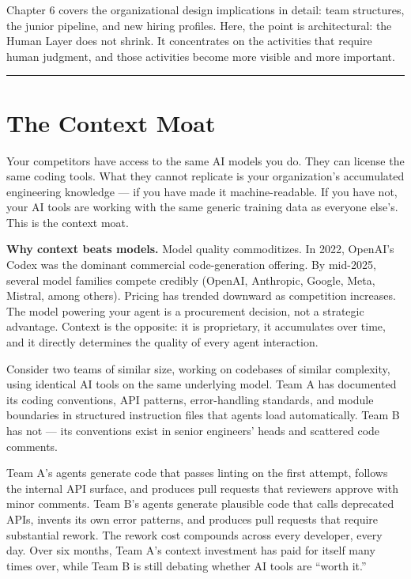 \documentclass[
  a4paper,
  DIV=11,
  numbers=noendperiod]{scrreprt}
\begin{document}
Chapter 6 covers the organizational design implications in detail: team
structures, the junior pipeline, and new hiring profiles. Here, the
point is architectural: the Human Layer does not shrink. It concentrates
on the activities that require human judgment, and those activities
become more visible and more important.

\begin{center}\rule{0.5\linewidth}{0.5pt}\end{center}

\section{The Context Moat}\label{the-context-moat}

Your competitors have access to the same AI models you do. They can
license the same coding tools. What they cannot replicate is your
organization's accumulated engineering knowledge --- if you have made it
machine-readable. If you have not, your AI tools are working with the
same generic training data as everyone else's. This is the context moat.

\textbf{Why context beats models.} Model quality commoditizes. In 2022,
OpenAI's Codex was the dominant commercial code-generation offering. By
mid-2025, several model families compete credibly (OpenAI, Anthropic,
Google, Meta, Mistral, among others). Pricing has trended downward as
competition increases. The model powering your agent is a procurement
decision, not a strategic advantage. Context is the opposite: it is
proprietary, it accumulates over time, and it directly determines the
quality of every agent interaction.

Consider two teams of similar size, working on codebases of similar
complexity, using identical AI tools on the same underlying model. Team
A has documented its coding conventions, API patterns, error-handling
standards, and module boundaries in structured instruction files that
agents load automatically. Team B has not --- its conventions exist in
senior engineers' heads and scattered code comments.

Team A's agents generate code that passes linting on the first attempt,
follows the internal API surface, and produces pull requests that
reviewers approve with minor comments. Team B's agents generate
plausible code that calls deprecated APIs, invents its own error
patterns, and produces pull requests that require substantial rework.
The rework cost compounds across every developer, every day. Over six
months, Team A's context investment has paid for itself many times over,
while Team B is still debating whether AI tools are ``worth it.''
\end{document}
